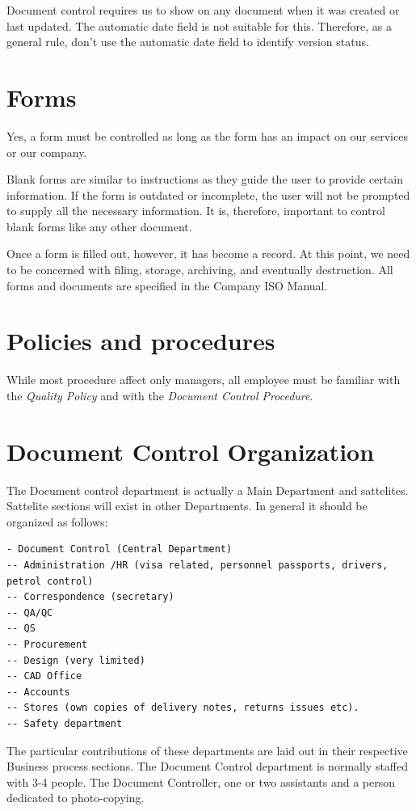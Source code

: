 Document control requires us to show on any document when it was created or last updated. The automatic date field is not suitable for this. Therefore, as a general rule, don’t use the automatic date field to identify version status.


\section*{Forms}

Yes, a form must be controlled as long as the form has an impact on our services or our company.

Blank forms are similar to instructions as they guide the user to provide certain information. If the form is outdated or incomplete, the user will not be prompted to supply all the necessary information. It is, therefore, important to control blank forms like any other document.

Once a form is filled out, however, it has become a record. At this point, we need to be concerned with filing, storage, archiving, and eventually destruction.
All forms and documents are specified in the Company ISO Manual.

\section*{Policies and procedures}

While most procedure affect only managers, all employee must be familiar with the \textit{Quality Policy} and with the \textit{Document Control Procedure}.

\section*{Document Control Organization}

The Document control department is actually a Main Department and sattelites. Sattelite sections will exist in other Departments. In general it should be organized as follows:

\begin{verbatim}
- Document Control (Central Department)
-- Administration /HR (visa related, personnel passports, drivers, petrol control)
-- Correspondence (secretary)
-- QA/QC
-- QS
-- Procurement
-- Design (very limited)
-- CAD Office
-- Accounts
-- Stores (own copies of delivery notes, returns issues etc).
-- Safety department
\end{verbatim}

The particular contributions of these departments are laid out in their respective Business process sections. The Document Control department is normally staffed with 3-4 people. The Document Controller, one or two assistants and a person dedicated to photo-copying. 


